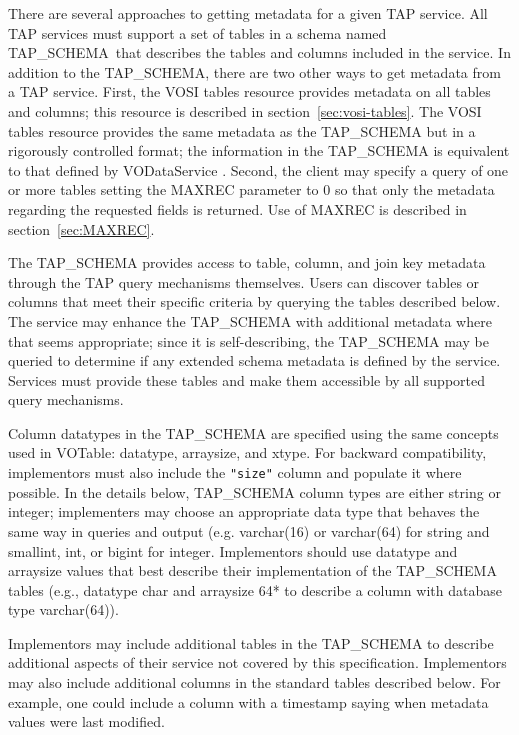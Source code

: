 \documentclass[11pt,letter]{ivoa}
\newcommand{\tapschema}{TAP\_SCHE\-MA}
\newcommand{\tapschema}{\mbox{%
  \relsize{-0.5}TAP\discretionary{-}{}{\kern-2pt\_}SCHEMA}}
\begin{document}
There are several approaches to getting metadata for a given TAP service. All 
TAP services must support a set of tables in a schema named 
\tapschema\ that describes the tables and columns included in the 
service. In addition to the \tapschema, there are two other ways 
to get metadata from a TAP service. First, the VOSI tables resource provides 
metadata on all tables and columns; this resource is described in 
section~\ref{sec:vosi-tables}. The 
VOSI tables resource provides the same metadata as the \tapschema{}
but in a rigorously controlled format; the information in the 
\tapschema{} is equivalent to that defined by VODataService 
\citep{2010ivoa.spec.1202P}. Second, the client may specify a query of one or more 
tables setting the 
MAXREC parameter to 0 so that only the metadata regarding the requested fields 
is returned. Use of MAXREC is described in section~\ref{sec:MAXREC}.

The \tapschema{} provides access to table, column, and join key 
metadata through the TAP query mechanisms themselves. Users can discover tables 
or columns that meet their specific criteria by querying the tables described 
below.  The service may enhance the \tapschema{} with additional 
metadata where that seems appropriate; since it is self-describing, the 
\tapschema{} may be queried to determine if any extended schema 
metadata is defined by the service. Services must provide these tables and make 
them accessible by all supported query mechanisms.

Column datatypes in the \tapschema{} are specified using the same concepts used in 
VOTable: datatype, arraysize, and xtype. For backward compatibility, implementors
must also include the \verb|"size"| column and populate it where possible. In the details
below, \tapschema{} column types are either string or integer; implementers may choose an 
appropriate data type that behaves the same way in queries and output (e.g. varchar(16) or
varchar(64) for string and smallint, int, or bigint for integer.
Implementors should use datatype and arraysize values
that best describe their implementation of the \tapschema{} tables (e.g., datatype char 
and arraysize 64* to describe a column with database type varchar(64)).

Implementors may include additional tables in the 
\tapschema{} to describe additional aspects of their service not 
covered by this specification. Implementors may also include additional columns 
in the standard tables described below. For example, one could include a column 
with a timestamp saying when metadata values were last modified.
\end{document}
